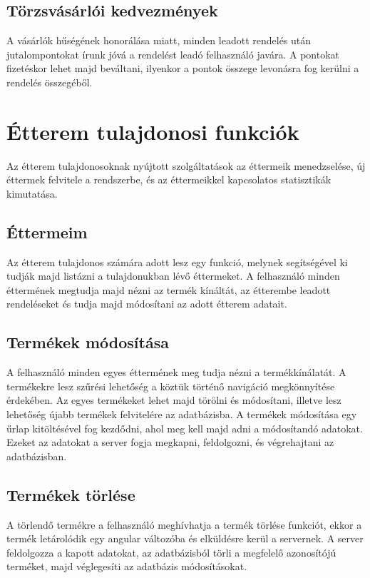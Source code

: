 \subsection{Törzsvásárlói kedvezmények}

A vásárlók hűségének honorálása miatt, minden leadott rendelés után jutalompontokat írunk jóvá a rendelést leadó felhasználó javára. A pontokat fizetéskor lehet majd beváltani, ilyenkor a pontok összege levonásra fog kerülni a rendelés összegéből.

\section{Étterem tulajdonosi funkciók}

Az étterem tulajdonosoknak nyújtott szolgáltatások az éttermeik menedzselése, új éttermek felvitele a rendszerbe, és az éttermeikkel kapcsolatos statisztikák kimutatása.

\subsection{Éttermeim}

Az étterem tulajdonos számára adott lesz egy funkció, melynek segítségével ki tudják majd listázni a tulajdonukban lévő éttermeket. A felhasználó minden éttermének megtudja majd nézni az termék kínáltát, az étterembe leadott rendeléseket és tudja majd módosítani az adott étterem adatait.

\subsection{Termékek módosítása}

A felhasználó minden egyes éttermének meg tudja nézni a termékkínálatát. A termékekre lesz szűrési lehetőség a köztük történő navigáció megkönnyítése érdekében. Az egyes termékeket lehet majd törölni és módosítani, illetve lesz lehetőség újabb termékek felvitelére az adatbázisba.
A termékek módosítása egy űrlap kitöltésével fog kezdődni, ahol meg kell majd adni a módosítandó adatokat. Ezeket az adatokat a server fogja megkapni, feldolgozni, és végrehajtani az adatbázisban.

\subsection{Termékek törlése}

A törlendő termékre a felhasználó meghívhatja a termék törlése funkciót, ekkor a termék letárolódik egy angular változóba és elküldésre kerül a servernek. A server feldolgozza a kapott adatokat, az adatbázisból törli a megfelelő azonosítójú terméket, majd véglegesíti az adatbázis módosításokat.

